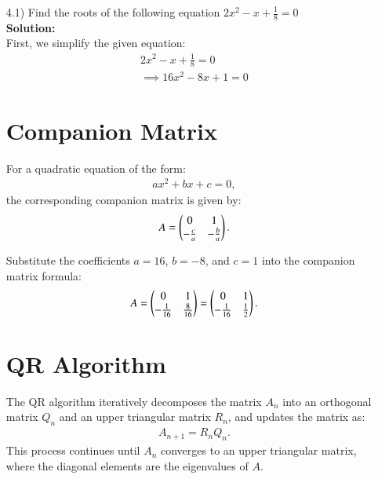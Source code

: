 \documentclass[journal]{IEEEtran}
\begin{document}
\begin{enumerate}
\item [4.1)] Find the roots of the following equation $2x^2 - x + \frac{1}{8} = 0$\\
\textbf{Solution:} \\
First, we simplify the given equation:
\begin{align}
    2x^2 - x + \frac{1}{8} = 0 \\
    \implies 16x^2 - 8x + 1 = 0
\end{align}

\section*{Companion Matrix}
For a quadratic equation of the form:
\begin{align}
    ax^2 + bx + c = 0,
\end{align}
the corresponding companion matrix is given by:
\begin{align}
    A = 
    \begin{pmatrix}
        0 & 1 \\
        -\frac{c}{a} & -\frac{b}{a}
    \end{pmatrix}.
\end{align}

Substitute the coefficients $a = 16$, $b = -8$, and $c = 1$ into the companion matrix formula:
\begin{align}
    A = 
    \begin{pmatrix}
        0 & 1 \\
        -\frac{1}{16} & \frac{8}{16}
    \end{pmatrix}
    =
    \begin{pmatrix}
        0 & 1 \\
        -\frac{1}{16} & \frac{1}{2}
    \end{pmatrix}.
\end{align}

\section*{QR Algorithm}
The QR algorithm iteratively decomposes the matrix $A_n$ into an orthogonal matrix $Q_n$ and an upper triangular matrix $R_n$, and updates the matrix as:
\begin{align}
    A_{n+1} = R_n Q_n.
\end{align}
This process continues until $A_n$ converges to an upper triangular matrix, where the diagonal elements are the eigenvalues of $A$.


\end{enumerate}
\end{document}
